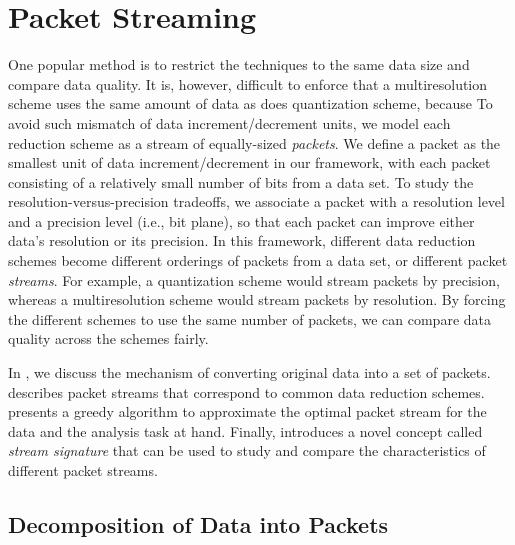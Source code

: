 \section{Packet Streaming} \label{sec:terminologies}

One popular method is to restrict the techniques to the same data size and
compare data quality. It is, however, difficult to enforce that a
multiresolution scheme uses the same amount of data as does quantization scheme,
because   To avoid such mismatch of data increment/decrement units, we model
each reduction scheme as a stream of equally-sized \emph{packets}.  We define a
packet as the smallest unit of data increment/decrement in our framework, with
each packet consisting of a relatively small number of bits from a data set. To
study the resolution-versus-precision tradeoffs, we associate a packet with a
resolution level and a precision level (i.e., bit plane), so that each packet
can improve either data's resolution or its precision. In this framework,
different data reduction schemes become different orderings of packets from a
data set, or different packet \emph{streams}.  For example, a quantization
scheme would stream packets by precision, whereas a multiresolution scheme would
stream packets by resolution. By forcing the different schemes to use the same
number of packets, we can compare data quality across the schemes fairly.

In , we discuss the mechanism of converting
original data into a set of packets. 
describes packet streams that correspond to common data reduction schemes.
 presents a greedy algorithm to approximate the
optimal packet stream for the data and the analysis task at hand. Finally,
 introduces a novel concept called \emph{stream
signature} that can be used to study and compare the characteristics of
different packet streams.

\subsection{Decomposition of Data into Packets} \label{sec:data-streaming-framework}

